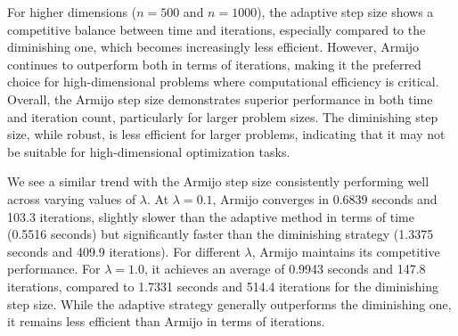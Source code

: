 \documentclass[pdflatex,sn-mathphys-num]{sn-jnl}%
\theoremstyle{definition} %
\theoremstyle{remark} %
\begin{document}
For higher dimensions (\( n = 500 \) and \( n = 1000 \)), the adaptive step size shows a competitive balance between time and iterations, especially compared to the diminishing one, which becomes increasingly less efficient. However, Armijo continues to outperform both in terms of iterations, making it the preferred choice for high-dimensional problems where computational efficiency is critical.
Overall, the Armijo step size demonstrates superior performance in both time and iteration count, particularly for larger problem sizes. 
The diminishing step size, while robust, is less efficient for larger problems, indicating that it may not be suitable for high-dimensional optimization tasks.

We see a similar trend with the Armijo step size consistently performing well across varying values of \( \lambda \). At \( \lambda = 0.1 \), Armijo converges in 0.6839 seconds and 103.3 iterations, slightly slower than the adaptive method in terms of time (0.5516 seconds) but significantly faster than the diminishing strategy (1.3375 seconds and 409.9 iterations). For different \( \lambda \), Armijo maintains its competitive performance. For \( \lambda = 1.0 \), it achieves an average of 0.9943 seconds and 147.8 iterations, compared to 1.7331 seconds and 514.4 iterations for the diminishing step size. While the adaptive strategy generally outperforms the diminishing one, it remains less efficient than Armijo in terms of iterations. 
\end{document}
